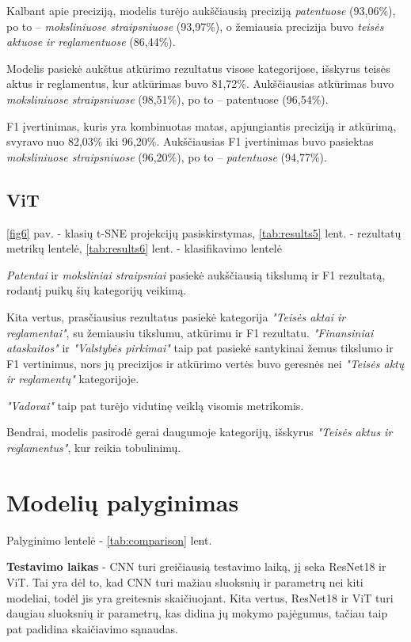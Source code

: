 \documentclass[conference]{IEEEtran}
\begin{document}
Kalbant apie preciziją, modelis turėjo aukščiausią preciziją \textit{patentuose} (93,06\%), po to -- \textit{moksliniuose straipsniuose} (93,97\%), o žemiausia precizija buvo \textit{teisės aktuose ir reglamentuose} (86,44\%). 

Modelis pasiekė aukštus atkūrimo rezultatus visose kategorijose, išskyrus teisės aktus ir reglamentus, kur atkūrimas buvo 81,72\%. Aukščiausias atkūrimas buvo \textit{moksliniuose straipsniuose} (98,51\%), po to -- patentuose (96,54\%).

F1 įvertinimas, kuris yra kombinuotas matas, apjungiantis preciziją ir atkūrimą, svyravo nuo 82,03\% iki 96,20\%. Aukščiausias F1 įvertinimas buvo pasiektas \textit{moksliniuose straipsniuose} (96,20\%), po to -- \textit{patentuose} (94,77\%).

\subsection{ViT}

\ref{fig6} pav. - klasių t-SNE projekcijų pasiskirstymas, \ref{tab:results5} lent. - rezultatų metrikų lentelė, \ref{tab:results6} lent. - klasifikavimo lentelė 


\textit{Patentai} ir \textit{moksliniai straipsniai} pasiekė aukščiausią tikslumą ir F1 rezultatą, rodantį puikų šių kategorijų veikimą. 

Kita vertus, prasčiausius rezultatus pasiekė kategorija \textit{"Teisės aktai ir reglamentai"}, su žemiausiu tikslumu, atkūrimu ir F1 rezultatu. \textit{"Finansiniai ataskaitos"} ir \textit{"Valstybės pirkimai"} taip pat pasiekė santykinai žemus tikslumo ir F1 vertinimus, nors jų precizijos ir atkūrimo vertės buvo geresnės nei \textit{"Teisės aktų ir reglamentų"} kategorijoje.

\textit{"Vadovai"} taip pat turėjo vidutinę veiklą visomis metrikomis.

Bendrai, modelis pasirodė gerai daugumoje kategorijų, išskyrus \textit{"Teisės aktus ir reglamentus"}, kur reikia tobulinimų.



\section{Modelių palyginimas}

Palyginimo lentelė - \ref{tab:comparison} lent.

\textbf{Testavimo laikas} - CNN turi greičiausią testavimo laiką, jį seka ResNet18 ir ViT. Tai yra dėl to, kad CNN turi mažiau sluoksnių ir parametrų nei kiti modeliai, todėl jis yra greitesnis skaičiuojant. Kita vertus, ResNet18 ir ViT turi daugiau sluoksnių ir parametrų, kas didina jų mokymo pajėgumus, tačiau taip pat padidina skaičiavimo sąnaudas.
\end{document}
